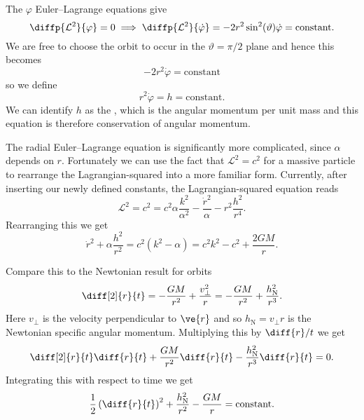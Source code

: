 \documentclass[fleqn]{NotesClass}
\newcommand*{\lagrangian}{\mathcal{L}}
\begin{document}
    The \(\varphi\) Euler--Lagrange equations give
    \begin{equation}
        \diffp{\lagrangian^2}{\varphi} = 0 \implies \diffp{\lagrangian^2}{\dot{\varphi}} = -2r^2\sin^2(\vartheta)\dot{\varphi} = \text{constant}.
    \end{equation}
    We are free to choose the orbit to occur in the \(\vartheta = \pi/2\) plane and hence this becomes
    \begingroup
    \setlength{\abovedisplayskip}{-5pt}
    \begin{equation}
        -2r^2\dot{\varphi} = \text{constant}
    \end{equation}
    \endgroup
    so we define
    \begin{equation}
        r^2\dot{\varphi} = h = \text{constant}.
    \end{equation}
    We can identify \(h\) as the , which is the angular momentum per unit mass and this equation is therefore conservation of angular momentum.
    
    The radial Euler--Lagrange equation is significantly more complicated, since \(\alpha\) depends on \(r\).
    Fortunately we can use the fact that \(\lagrangian^2 = c^2\) for a massive particle to rearrange the Lagrangian-squared into a more familiar form.
    Currently, after inserting our newly defined constants, the Lagrangian-squared equation reads
    \begin{equation}
        \lagrangian^2 = c^2 = c^2\alpha\frac{k^2}{\alpha^2} - \frac{\dot{r}^2}{\alpha} - r^2\frac{h^2}{r^4}.
    \end{equation}
    Rearranging this we get
    \begin{equation}
        \dot{r}^2 + \alpha\frac{h^2}{r^2}  = c^2(k^2 - \alpha) = c^2k^2 - c^2 + \frac{2GM}{r}.
    \end{equation}

    Compare this to the Newtonian result for orbits
    \begin{equation}
        \diff[2]{r}{t} = -\frac{GM}{r^2} + \frac{v_{\perp}^2}{r} = -\frac{GM}{r^2} + \frac{h_{\mathrm{N}}^2}{r^3}.
    \end{equation}
    Here \(v_{\perp}\) is the velocity perpendicular to \(\ve{r}\) and so \(h_{\mathrm{N}} = v_{\perp}r\) is the Newtonian specific angular momentum.
    Multiplying this by \(\diff{r}/{t}\) we get
    \begin{equation}
        \diff[2]{r}{t}\diff{r}{t} + \frac{GM}{r^2}\diff{r}{t} - \frac{h_{\mathrm{N}}^2}{r^3}\diff{r}{t} = 0.
    \end{equation}
    Integrating this with respect to time we get
    \begin{equation}
        \frac{1}{2}\left( \diff{r}{t} \right)^2 + \frac{h_{\mathrm{N}}^2}{r^2} - \frac{GM}{r} = \text{constant}.
    \end{equation}
    
\end{document}
